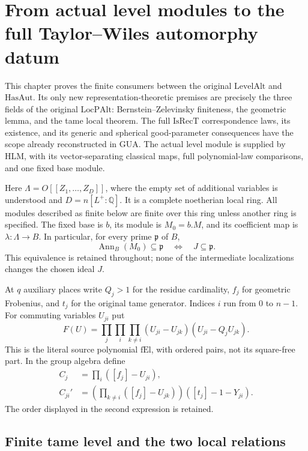 \section{From actual level modules to the full Taylor--Wiles automorphy datum}
\label{sec:hida-taylor-wiles-v45}

This chapter proves the finite consumers between the original
\(\mathrm{LevelAlt}\) and \(\mathrm{HasAut}\).  Its only new
representation-theoretic premises are precisely the three fields
of the original \(\mathrm{LocPAlt}\): Bernstein--Zelevinsky
finiteness, the geometric lemma, and the tame local theorem.
The full \(\mathrm{IsRecT}\) correspondence laws, its existence,
and its generic and spherical good-parameter consequences have
the scope already reconstructed in GUA.  The actual level module
is supplied by HLM, with its vector-separating classical maps,
full polynomial-law comparisons, and one fixed base module.

Here \(\Lambda=O[[Z_1,\ldots,Z_D]]\), where the empty set of
additional variables is understood and \(D=n[L^+:\mathbb Q]\).
It is a complete noetherian local ring.  All modules described as
finite below are finite over this ring unless another ring is
specified.  The fixed base is \(b\), its module is \(M_0=b.M\),
and its coefficient map is \(\lambda:\Lambda\to B\).  In
particular, for every prime \(\mathfrak p\) of \(B\),
\[
 \operatorname{Ann}_B(M_0)\subseteq\mathfrak p
       \quad\Longleftrightarrow\quad J\subseteq\mathfrak p .
 \tag{HTW.1}
\]
This equivalence is retained throughout; none of the intermediate
localizations changes the chosen ideal \(J\).

At \(q\) auxiliary places write \(Q_j>1\) for the residue
cardinality, \(f_j\) for geometric Frobenius, and \(t_j\) for
the original tame generator.  Indices \(i\) run from \(0\) to
\(n-1\).  For commuting variables \(U_{ji}\) put
\[
 F(U)=\prod_j\prod_i\prod_{k\ne i}
             (U_{ji}-U_{jk})(U_{ji}-Q_jU_{jk}).
 \tag{HTW.2}
\]
This is the literal source polynomial \(\mathrm{fEl}\), with
ordered pairs, not its square-free part.  In the group algebra
define
\[
 \begin{split}
 C_j&=\prod_i([f_j]-U_{ji}),\\
 C_{ji}'&=\left(\prod_{k\ne i}([f_j]-U_{jk})\right)
                                      ([t_j]-1-Y_{ji}).
 \end{split}
 \tag{HTW.3}
\]
The order displayed in the second expression is retained.

\subsection{Finite tame level and the two local relations}

